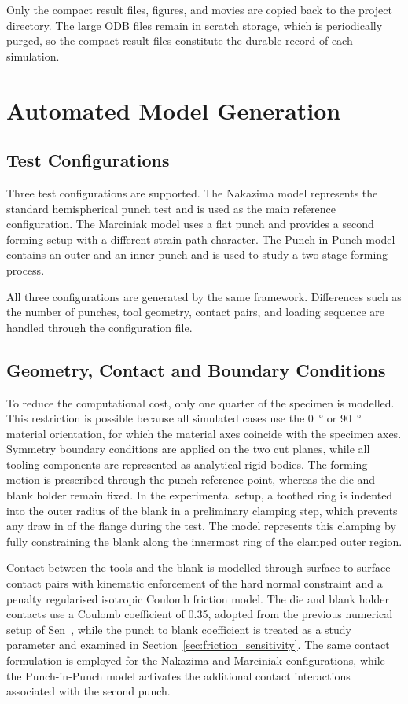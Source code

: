 Only the compact result files, figures, and movies are copied back to the
project directory. The large ODB files remain in scratch storage, which is
periodically purged, so the compact result files constitute the durable record
of each simulation.

\section{Automated Model Generation}

\subsection{Test Configurations}

Three test configurations are supported. The Nakazima model represents the
standard hemispherical punch test and is used as the main reference
configuration. The Marciniak model uses a flat punch and provides a second
forming setup with a different strain path character. The Punch-in-Punch model
contains an outer and an inner punch and is used to study a two stage forming
process.

All three configurations are generated by the same framework. Differences such
as the number of punches, tool geometry, contact pairs, and loading sequence
are handled through the configuration file. 

\subsection{Geometry, Contact and Boundary Conditions}

To reduce the computational cost, only one quarter of the specimen is
modelled. This restriction is possible because all simulated cases use the
\SI{0}{\degree} or \SI{90}{\degree} material orientation, for which the
material axes coincide with the specimen axes. Symmetry boundary conditions
are applied on the two cut planes, while all tooling components are
represented as analytical rigid bodies. The forming motion is prescribed
through the punch reference point, whereas the die and blank holder remain
fixed. In the experimental setup, a toothed ring is indented into the outer
radius of the blank in a preliminary clamping step, which prevents any draw in
of the flange during the test. The model represents this clamping by fully
constraining the blank along the innermost ring of the clamped outer region.

Contact between the tools and the blank is modelled through surface to surface
contact pairs with kinematic enforcement of the hard normal constraint and a
penalty regularised isotropic Coulomb friction model. The die and blank holder
contacts use a Coulomb coefficient of \num{0.35}, adopted from the previous
numerical setup of Sen~\cite{Sen2025}, while the punch to blank coefficient is
treated as a study parameter and examined in
Section~\ref{sec:friction_sensitivity}. The same contact formulation is
employed for the Nakazima and Marciniak configurations, while the
Punch-in-Punch model activates the additional contact interactions associated with the
second punch.

